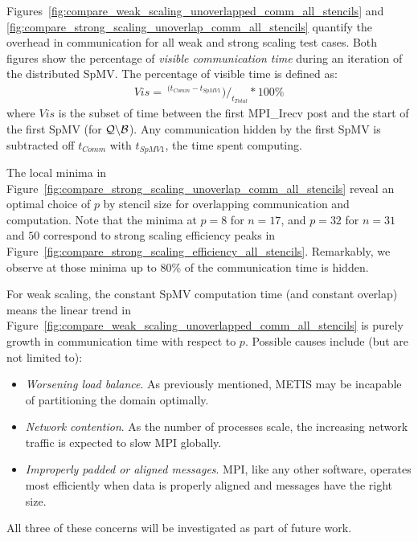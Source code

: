 \documentclass{report}
\begin{document}
Figures~\ref{fig:compare_weak_scaling_unoverlapped_comm_all_stencils} and \ref{fig:compare_strong_scaling_unoverlap_comm_all_stencils}  quantify the overhead in communication for all weak and strong scaling test cases. Both figures show the percentage of \emph{visible communication time} during an iteration of the distributed SpMV. The percentage of visible time is defined as: 
\begin{align*}
Vis = \ ^{(t_{Comm} - t_{SpMV 1}}) /_{t_{Total}} * 100\%
\end{align*}
where $Vis$ is the subset of time between the first MPI\_Irecv post and the start of the first SpMV (for $\mathcal{Q} \backslash \mathcal{B}$). Any communication hidden by the first SpMV is subtracted off $t_{Comm}$ with $t_{SpMV 1}$, the time spent computing.

The local minima in  Figure~\ref{fig:compare_strong_scaling_unoverlap_comm_all_stencils} reveal an optimal choice of $p$ by stencil size for overlapping communication and computation. Note that the minima at $p=8$ for $n=17$, and $p=32$ for $n=31$ and $50$ correspond to strong scaling efficiency peaks in Figure~\ref{fig:compare_strong_scaling_efficiency_all_stencils}. Remarkably, we observe at those minima up to 80\% of the communication time is hidden. 

 For weak scaling, the constant SpMV computation time (and constant overlap) means the linear trend in Figure~\ref{fig:compare_weak_scaling_unoverlapped_comm_all_stencils}  is purely growth in communication time with respect to $p$. Possible causes include (but are not limited to): 
\begin{itemize}
\item \emph{Worsening load balance}. As previously mentioned, METIS may be incapable of partitioning the domain optimally.
\item \emph{Network contention}. As the number of processes scale, the increasing network traffic is expected to slow MPI globally.  
\item \emph{Improperly padded or aligned messages}. MPI, like any other software, operates most efficiently when data is properly aligned and messages have the right size. 
\end{itemize}
All three of these concerns will be investigated as part of future work. 

%
\end{document}
